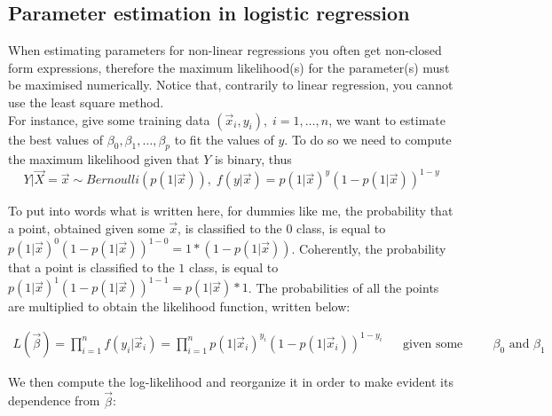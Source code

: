     \subsection{Parameter estimation in logistic regression}
    When estimating parameters for non-linear regressions you often get
    non-closed form expressions, therefore the maximum likelihood(s) for the
    parameter(s) must be maximised numerically. Notice that, contrarily to
    linear regression, you cannot use the least square method. \\

    For instance, give some training data $(\vec{x}_i, y_i), \; i=1, \dots, n$,
    we want to estimate the best values of $\beta_0, \beta_1, \dots, \beta_p$ to
    fit the values of $y$. To do so we need to compute the maximum likelihood
    given that $Y$ is binary, thus
    $$Y|\vec{X} = \vec{x} \sim Bernoulli(p(1|\vec{x})), \; f(y|\vec{x}) =
    p(1|\vec{x})^y(1-p(1|\vec{x}))^{1-y}$$

    To put into words what is written here, for dummies like me, the probability
    that a point, obtained given some $\vec{x}$, is classified to the $0$ class,
    is equal to $p(1|\vec{x})^0 (1-p(1|\vec{x}))^{1-0} = 1 * (1-p(1|\vec{x}))$.
    Coherently, the probability that a point is classified to the $1$ class, is
    equal to $p(1|\vec{x})^1 (1-p(1|\vec{x}))^{1-1} = p(1|\vec{x}) * 1$. The
    probabilities of all the points are multiplied to obtain the likelihood
    function, written below:
    
    \begin{align*}
    L(\vec{\beta}) = \prod_{i=1}^{n}f(y_i|\vec{x}_i) = \prod_{i=1}^{n}p(1|\vec{x}_i)^{y_i}(1-p(1|\vec{x}_i))^{1-y_i} && \text{given some values of $\beta_0$ and $\beta_1$}
    \end{align*} %
    
    We then compute the log-likelihood and reorganize it in order to make
    evident its dependence from $\vec{\beta}$:
    
